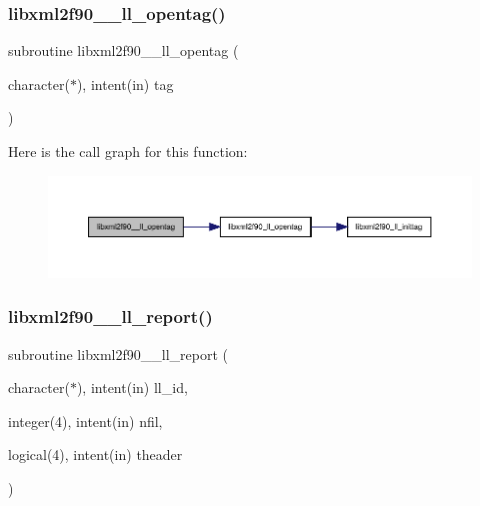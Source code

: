 \subsubsection{\texorpdfstring{libxml2f90\+\_\+\+\_\+ll\+\_\+opentag()}{libxml2f90\_\_ll\_opentag()}}
{\footnotesize\ttfamily subroutine libxml2f90\+\_\+\+\_\+ll\+\_\+opentag (\begin{DoxyParamCaption}\item[{character($\ast$), intent(in)}]{tag }\end{DoxyParamCaption})}

Here is the call graph for this function\+:
\nopagebreak
\begin{figure}[H]
\begin{center}
\leavevmode
\includegraphics[width=350pt]{libxml2f90_8f90__pp_8f90_a113f047d3ac5fe6e1573d1c123afbd87_cgraph}
\end{center}
\end{figure}
\mbox{\label{libxml2f90_8f90__pp_8f90_a82abdf47d88bfca1f54ddd7fb0ca71f2}} 
\subsubsection{\texorpdfstring{libxml2f90\+\_\+\+\_\+ll\+\_\+report()}{libxml2f90\_\_ll\_report()}}
{\footnotesize\ttfamily subroutine libxml2f90\+\_\+\+\_\+ll\+\_\+report (\begin{DoxyParamCaption}\item[{character($\ast$), intent(in)}]{ll\+\_\+id,  }\item[{integer(4), intent(in)}]{nfil,  }\item[{logical(4), intent(in)}]{theader }\end{DoxyParamCaption})}

